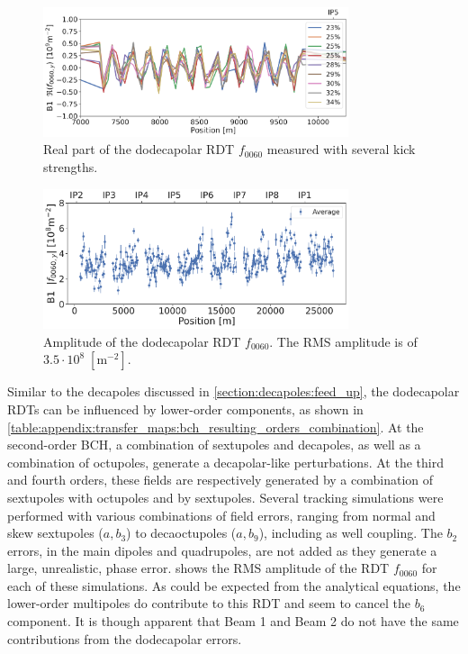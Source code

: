 \begin{figure}[!htb]
    \centering
    \includegraphics[width=0.8\textwidth]{./images/f0060y_all_meas_real.pdf}
    \caption{Real part of the dodecapolar RDT $f_{0060}$ measured with several kick strengths.}
    \label{fig:high_orders:dodecapolar_f0060}
\end{figure}

\begin{figure}[!htb]
    \centering
    \includegraphics[width=0.8\textwidth]{./images/f0060y_all_meas_avg_amp.pdf} \caption{Amplitude
    of the dodecapolar RDT $f_{0060}$. The RMS amplitude is of $3.5\cdot10^{8}\;[\text{m}^{-2}]$.}
    \label{fig:high_orders:dodecapolar_f0060_avg}
\end{figure}



Similar to the decapoles discussed in \cref{section:decapoles:feed_up}, the dodecapolar RDTs can be
influenced by lower-order components, as shown in
\cref{table:appendix:transfer_maps:bch_resulting_orders_combination}. At the second-order BCH, a
combination of sextupoles and decapoles, as well as a combination of octupoles, generate a
decapolar-like perturbations. At the third and fourth orders, these fields are respectively
generated by a combination of sextupoles with octupoles and by sextupoles.  
Several tracking simulations were performed with various combinations of field errors, ranging from
normal and skew sextupoles ($a,b_3$) to decaoctupoles ($a,b_9$), including as well coupling.
The $b_2$ errors, in the main dipoles and quadrupoles, are not added as they generate a large,
unrealistic, phase error.
 shows the RMS amplitude of the RDT $f_{0060}$ for each of
these simulations. As could be expected from the analytical equations, the lower-order multipoles do
contribute to this RDT and seem to cancel the $b_6$ component. It is though apparent that Beam 1 and
Beam 2 do not have the same contributions from the dodecapolar errors. 


